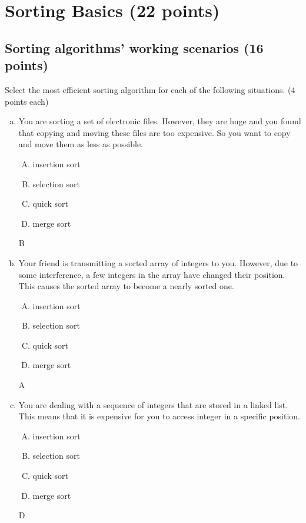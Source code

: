 \documentclass[11pt]{exam}
\begin{document}
\section{Sorting Basics (22 points)}

\subsection{Sorting algorithms' working scenarios (16 points)}

Select the most efficient sorting algorithm for each of the following situations. (4 points each)
\begin{enumerate}[(a)]
    \item You are sorting a set of electronic files. However, they are huge and you found that copying and moving these files are too expensive. So you want to copy and move them as less as possible.
          \begin{enumerate}[A)]
              \item insertion sort
              \item selection sort
              \item quick sort
              \item merge sort
          \end{enumerate}
          \begin{solution}
              B
          \end{solution}

    \item Your friend is transmitting a sorted array of integers to you. However, due to some interference, a few integers in the array have changed their position. This causes the sorted array to become a nearly sorted one.
          \begin{enumerate}[A)]
              \item insertion sort
              \item selection sort
              \item quick sort
              \item merge sort
          \end{enumerate}
          \begin{solution}
              A
          \end{solution}

    \item You are dealing with a sequence of integers that are stored in a linked list. This means that it is expensive for you to access integer in a specific position.
          \begin{enumerate}[A)]
              \item insertion sort
              \item selection sort
              \item quick sort
              \item merge sort
          \end{enumerate}
          \begin{solution}
            D
          \end{solution}


\end{enumerate}
\end{document}
